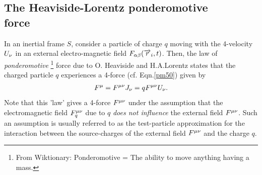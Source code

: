 \subsection{The Heaviside-Lorentz ponderomotive\\ 
force} 
In an inertial frame $S$, consider a particle of charge 
$q$  moving with the 4-velocity $U_{{\nu}}$ in an external 
electro-magnetic field $F_{{\alpha}{\beta}}(\overrightarrow{r}_i,t)$. Then, 
the law of \textsl{ponderomotive} \footnote{From 
Wiktionary: Ponderomotive = The ability to move anything 
having a mass.} force due to  O. Heaviside and 
H.A.Lorentz states that the charged particle $q$ 
experiences a 
4-force (cf. Eqn.\eqref{pm50}) given by 
\begin{align}
 F^{{\mu}}=F^{{\mu}{\nu}}J_{{\nu}}=q F^{{\mu}{\nu}}U_{{\nu}}.
\end{align}
Note that this 'law' gives a 4-force 
$F^{{\mu}{\nu}}$ under the assumption that  the 
electromagnetic field $F_q^{{\mu}{\nu}}$ due to $q$ 
\textsl{does not influence} the 
external field $F^{{\mu}{\nu}}$. Such an assumption  is 
usually referred to as the test-particle approximation for 
the interaction between the source-charges of the external 
field $F^{{\mu}{\nu}}$ and the  charge 
$q$.

